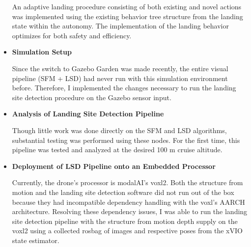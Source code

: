 \begin{itemize}
    An adaptive landing procedure consisting of both existing and novel actions was implemented using the existing behavior tree structure from the landing state within the autonomy. The implementation of the landing behavior optimizes for both safety and efficiency.
    \item \textbf{Simulation Setup}

    Since the switch to Gazebo Garden was made recently, the entire visual pipeline (SFM + LSD) had never run with this simulation environment before. Therefore, I implemented the changes necessary to run the landing site detection procedure on the Gazebo sensor input. 

    \item \textbf{Analysis of Landing Site Detection Pipeline}

    Though little work was done directly on the SFM and LSD algorithms, substantial testing was performed using these nodes. For the first time, this pipeline was tested and analyzed at the desired 100 m cruise altitude.

    \item \textbf{Deployment of LSD Pipeline onto an Embedded Processor}

    Currently, the drone's processor is modalAI's voxl2. Both the structure from motion and the landing site detection software did not run out of the box because they had incompatible dependency handling with the voxl's AARCH architecture. Resolving these dependency issues, I was able to run the landing site detection pipeline with the structure from motion depth supply on the voxl2 using a collected rosbag of images and respective poses from the xVIO state estimator.
\end{itemize}

